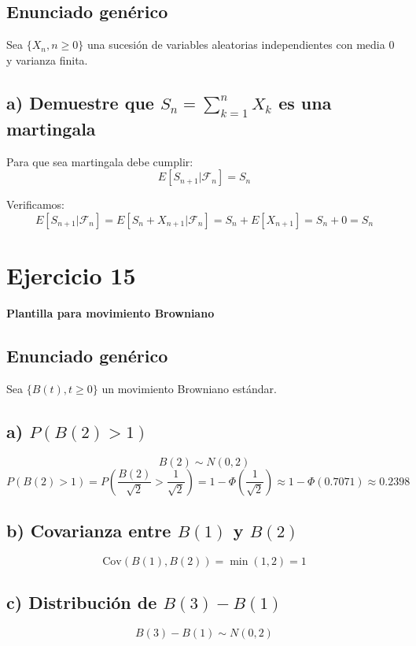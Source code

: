 \documentclass{article}
\begin{document}
\subsection*{Enunciado genérico}
Sea \(\{X_n, n \geq 0\}\) una sucesión de variables aleatorias independientes con media 0 y varianza finita.

\subsection*{a) Demuestre que \(S_n = \sum_{k=1}^n X_k\) es una martingala}

Para que sea martingala debe cumplir:
\[
E[S_{n+1} | \mathcal{F}_n] = S_n
\]

Verificamos:
\[
E[S_{n+1} | \mathcal{F}_n] = E[S_n + X_{n+1} | \mathcal{F}_n] = S_n + E[X_{n+1}] = S_n + 0 = S_n
\]

\section*{Ejercicio 15}

\textbf{Plantilla para movimiento Browniano}

\subsection*{Enunciado genérico}
Sea \(\{B(t), t \geq 0\}\) un movimiento Browniano estándar.

\subsection*{a) \(P(B(2) > 1)\)}

\[
B(2) \sim N(0, 2)
\]
\[
P(B(2) > 1) = P\left(\frac{B(2)}{\sqrt{2}} > \frac{1}{\sqrt{2}}\right) = 1 - \Phi\left(\frac{1}{\sqrt{2}}\right) \approx 1 - \Phi(0.7071) \approx 0.2398
\]

\subsection*{b) Covarianza entre \(B(1)\) y \(B(2)\)}

\[
\text{Cov}(B(1), B(2)) = \min(1, 2) = 1
\]

\subsection*{c) Distribución de \(B(3) - B(1)\)}

\[
B(3) - B(1) \sim N(0, 2)
\]
\end{document}
